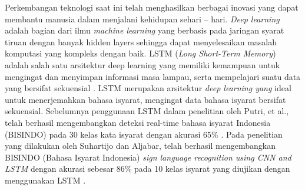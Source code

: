 Perkembangan teknologi saat ini telah menghasilkan berbagai inovasi yang dapat membantu manusia dalam menjalani kehidupan sehari – hari. \emph{Deep learning} adalah bagian dari ilmu \emph{machine learning} yang berbasis pada jaringan syarat tiruan dengan banyak hidden layers sehingga dapat menyelesaikan masalah komputasi yang kompleks dengan baik. LSTM (\emph{Long Short-Term Memory}) adalah salah satu arsitektur deep learning yang memiliki kemampuan untuk mengingat dan menyimpan informasi masa lampau, serta mempelajari suatu data yang bersifat sekuensial \parencite{sadli2020}. LSTM merupakan arsitektur \emph{deep learning yang} ideal untuk menerjemahkan bahasa isyarat, mengingat data bahasa isyarat bersifat sekuensial. Sebelumnya penggunaan LSTM dalam penelitian oleh Putri, et al., telah berhasil mengembangkan deteksi real-time bahasa isyarat Indonesia (BISINDO) pada 30 kelas kata isyarat dengan akurasi 65\% \parencite{putri2022}. Pada penelitian yang dilakukan oleh Suhartijo dan Aljabar, telah berhasil mengembangkan BISINDO (Bahasa Isyarat Indonesia) \emph{sign language recognition using CNN and LSTM} dengan akurasi sebesar 86\% pada 10 kelas isyarat yang diujikan dengan menggunakan LSTM \parencite{aljabar2020}. 




